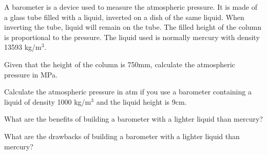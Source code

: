 \documentclass[main.tex]{subfiles}
\begin{document}
\begin{multicols*}{2}
\begin{question}[ID=\the\value{numA}]
A barometer is a device used to measure the atmospheric pressure. It is made of a glass tube filled with a liquid, inverted on a dish of the same liquid. When inverting the tube, liquid will remain on the tube. The filled height of the column is proportional to the pressure. The liquid used is normally mercury with density 13593 kg/$\text{m}^3$.
\begin{center}\end{center}
\begin{inparaenum}[(a)]	
\item  Given that the height of the column is 750mm, calculate the atmospheric pressure in MPa.
\item  Calculate the atmospheric pressure in atm if you use a barometer containing a liquid of density 1000 kg/$\text{m}^3$ and the liquid height is 9cm.
\item  What are the benefits of building a barometer with a lighter liquid than mercury?
\item  What are the drawbacks of building a barometer with a lighter liquid than mercury?
\end{inparaenum} 
\end{question}
\begin{solution}
\hspace{0.1cm}\end{solution}%






\end{multicols*}
\end{document}
